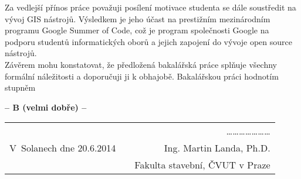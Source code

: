 \documentclass[czech,11pt,a4paper]{article}
\begin{document}
Za vedlejší přínos práce považuji posílení motivace studenta se dále
soustředit na vývoj GIS nástrojů. Výsledkem je jeho účast na
prestižním mezinárodním programu Google Summer of Code, což je
program společnosti Google na podporu studentů informatických oborů a
jejich zapojení do vývoje open source nástrojů.  \\

\newpage
Závěrem mohu konstatovat, že předložená bakalářská práce splňuje
všechny formální náležitosti a doporučuji ji k obhajobě. Bakalářskou
práci hodnotím stupněm

\vskip 2cm

\begin{center}
{\bf -- B (velmi dobře)  --}
\end{center}

\vskip 2cm

\begin{tabular}{lp{}r}
& & \ldots\ldots\ldots\ldots\ldots\ldots\ldots \\
V~Solanech dne 20.6.2014 & & Ing. Martin Landa, Ph.D. \\
& & Fakulta stavební, ČVUT v Praze \\
\end{tabular}
\end{document}
